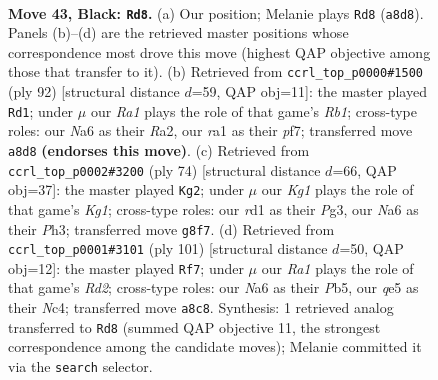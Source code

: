\documentclass[11pt]{article}
\begin{document}
\clearpage

\begin{figure}[p]\centering
\begin{subfigure}{0.46\textwidth}\centering
\resizebox{\linewidth}{!}{%
\newchessgame
\chessboard[
  setfen={r5k1/pp6/n6q/2pPQp2/8/P5P1/1P3K2/R2R4 b - - 5 43},
  showmover=false,
  pgfstyle=straightmove, color=movearrow, markmove={a8-d8}
]}
\caption{}
\end{subfigure}\hfill
\begin{subfigure}{0.46\textwidth}\centering
\resizebox{\linewidth}{!}{%
\newchessgame
\chessboard[
  setfen={3r4/P2r1p1k/2q3p1/4Q2p/8/5P1P/R2p2P1/1R5K w - - 0 47},
  showmover=false,
  pgfstyle=straightmove, color=movearrow, markmove={b1-d1}
]}
\caption{}
\end{subfigure}
\\[4pt]
\begin{subfigure}{0.46\textwidth}\centering
\resizebox{\linewidth}{!}{%
\newchessgame
\chessboard[
  setfen={8/3q2p1/5pk1/P1p1r3/2Qpp3/6PP/4PP2/1R4K1 w - - 1 38},
  showmover=false,
  pgfstyle=straightmove, color=movearrow, markmove={g1-g2}
]}
\caption{}
\end{subfigure}\hfill
\begin{subfigure}{0.46\textwidth}\centering
\resizebox{\linewidth}{!}{%
\newchessgame
\chessboard[
  setfen={4q2k/3r4/2pp3p/Pp3P2/1Pn5/2P3RP/5QP1/6K1 b - - 0 51},
  showmover=false,
  pgfstyle=straightmove, color=movearrow, markmove={d7-f7}
]}
\caption{}
\end{subfigure}
\caption{\textbf{Move 43, Black: \texttt{Rd8}.} (a) Our position; Melanie plays \texttt{Rd8} (\texttt{a8d8}). Panels (b)--(d) are the retrieved master positions whose correspondence most drove this move (highest QAP objective among those that transfer to it). (b) Retrieved from \texttt{ccrl\_top\_p0000\#1500} (ply 92) [structural distance $d$=59, QAP obj=11]: the master played \texttt{Rd1}; under $\mu$ our \emph{Ra1} plays the role of that game's \emph{Rb1}; cross-type roles: our \emph{N}a6 as their \emph{R}a2, our \emph{r}a1 as their \emph{p}f7; transferred move \texttt{a8d8} \textbf{(endorses this move)}. (c) Retrieved from \texttt{ccrl\_top\_p0002\#3200} (ply 74) [structural distance $d$=66, QAP obj=37]: the master played \texttt{Kg2}; under $\mu$ our \emph{Kg1} plays the role of that game's \emph{Kg1}; cross-type roles: our \emph{r}d1 as their \emph{P}g3, our \emph{N}a6 as their \emph{P}h3; transferred move \texttt{g8f7}. (d) Retrieved from \texttt{ccrl\_top\_p0001\#3101} (ply 101) [structural distance $d$=50, QAP obj=12]: the master played \texttt{Rf7}; under $\mu$ our \emph{Ra1} plays the role of that game's \emph{Rd2}; cross-type roles: our \emph{N}a6 as their \emph{P}b5, our \emph{q}e5 as their \emph{N}c4; transferred move \texttt{a8c8}. Synthesis: 1 retrieved analog transferred to \texttt{Rd8} (summed QAP objective 11, the strongest correspondence among the candidate moves); Melanie committed it via the \texttt{search} selector.}
\label{fig:thought-m85}
\end{figure}
\end{document}

